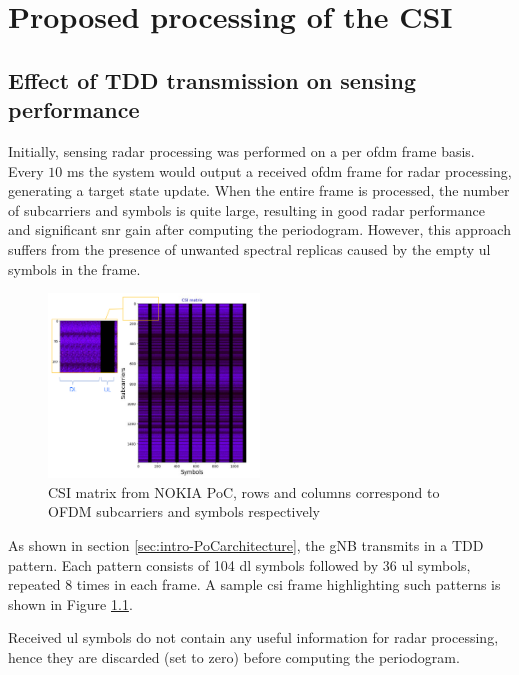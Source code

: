 \chapter{Proposed processing of the CSI}
\label{chap:TDD pattern of the OFDM frame}

\section{Effect of TDD transmission on sensing performance}

	Initially, sensing radar processing was performed on a per \gls{ofdm} frame basis. \protect\newline Every $10$ ms the system would output a received \gls{ofdm} frame for radar processing, generating a target state update. When the entire frame is processed, the number of subcarriers and symbols is quite large, resulting in good radar performance and significant \gls{snr} gain after computing the periodogram. However, this approach suffers from the presence of unwanted spectral replicas caused by the empty \gls{ul} symbols in the frame.
	
	\begin{figure}[H]
	    \centering
	    \includegraphics[width=0.5\textwidth]{Images/TDDprocessing/CSIMatrix_DLULpattern.png}
	    \caption{CSI matrix from NOKIA PoC, rows and columns correspond to OFDM subcarriers and symbols respectively}
	    \label{fig:CSIMatrix_DLULpattern}
	\end{figure}
	
	As shown in section \ref{sec:intro-PoCarchitecture}, the gNB transmits in a TDD pattern. Each pattern consists of 104 \gls{dl} symbols followed by 36 \gls{ul} symbols, repeated 8 times in each frame. A sample \gls{csi} frame highlighting such patterns is shown in Figure \ref{fig:CSIMatrix_DLULpattern}.
	
	Received \gls{ul} symbols do not contain any useful information for radar processing, hence they are discarded (set to zero) before computing the periodogram.
	    
